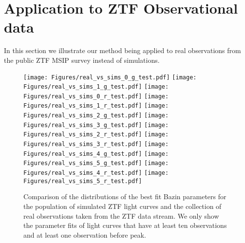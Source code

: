 \documentclass[fleqn,usenatbib]{mnras}
\begin{document}
\section{Application to ZTF Observational data}
\label{sec:application_to_real_ztf_data}
In this section we illustrate our method being applied to real observations from the public ZTF MSIP survey instead of simulations. 
\begin{figure*}
\centering
    {\texttt{[image: Figures/real\_vs\_sims\_0\_g\_test.pdf]}}
    {\texttt{[image: Figures/real\_vs\_sims\_1\_g\_test.pdf]}}
    {\texttt{[image: Figures/real\_vs\_sims\_0\_r\_test.pdf]}}
    {\texttt{[image: Figures/real\_vs\_sims\_1\_r\_test.pdf]}}
    {\texttt{[image: Figures/real\_vs\_sims\_2\_g\_test.pdf]}}
    {\texttt{[image: Figures/real\_vs\_sims\_3\_g\_test.pdf]}}
    {\texttt{[image: Figures/real\_vs\_sims\_2\_r\_test.pdf]}}
    {\texttt{[image: Figures/real\_vs\_sims\_3\_r\_test.pdf]}}
    {\texttt{[image: Figures/real\_vs\_sims\_4\_g\_test.pdf]}}
    {\texttt{[image: Figures/real\_vs\_sims\_5\_g\_test.pdf]}}
    {\texttt{[image: Figures/real\_vs\_sims\_4\_r\_test.pdf]}}
    {\texttt{[image: Figures/real\_vs\_sims\_5\_r\_test.pdf]}}


\caption[Distribution of Bazin function parameters for SNIa for the ZTF sims from \texttt{SNANA} and the real observations taken from the collection from the OSC and ZTF data stream.]{Comparison of the distributions of the best fit Bazin parameters for the population of simulated ZTF light curves and the collection of real observations taken from the ZTF data stream. We only show the parameter fits of light curves that have at least ten observations and at least one observation before peak.}
    \label{fig:real_data_Bazin_parameters}
\end{figure*}
\end{document}

